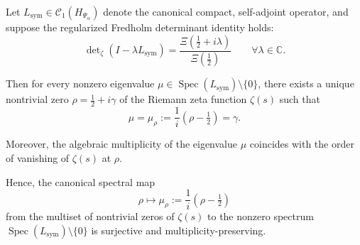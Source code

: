 \begin{lemma}
\label{lem:spectral_exhaustivity}
Let \( L_{\mathrm{sym}} \in \mathcal{C}_1(H_{\Psi_\alpha}) \) denote the canonical compact, self-adjoint operator, and suppose the regularized Fredholm determinant identity holds:
\[
\det\nolimits_\zeta(I - \lambda L_{\mathrm{sym}}) = \frac{\Xi\left(\tfrac{1}{2} + i\lambda\right)}{\Xi\left(\tfrac{1}{2}\right)} \qquad \forall \lambda \in \mathbb{C}.
\]

Then for every nonzero eigenvalue \( \mu \in \operatorname{Spec}(L_{\mathrm{sym}}) \setminus \{0\} \), there exists a unique nontrivial zero \( \rho = \tfrac{1}{2} + i\gamma \) of the Riemann zeta function \( \zeta(s) \) such that
\[
\mu = \mu_\rho := \frac{1}{i}(\rho - \tfrac{1}{2}) = \gamma.
\]

Moreover, the algebraic multiplicity of the eigenvalue \( \mu \) coincides with the order of vanishing of \( \zeta(s) \) at \( \rho \).

\medskip
\noindent
Hence, the canonical spectral map
\[
\rho \longmapsto \mu_\rho := \frac{1}{i}(\rho - \tfrac{1}{2})
\]
from the multiset of nontrivial zeros of \( \zeta(s) \) to the nonzero spectrum \( \operatorname{Spec}(L_{\mathrm{sym}}) \setminus \{0\} \) is surjective and multiplicity-preserving.
\end{lemma}
